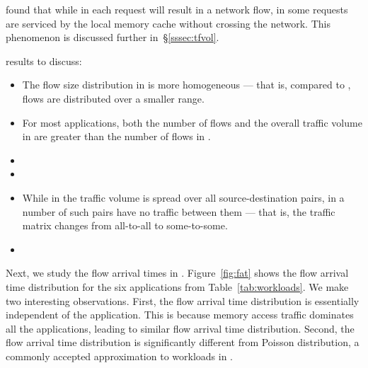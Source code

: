found that while in \pdis each request will result in a network flow, in \dis some requests are serviced by the local memory cache without crossing the network. This phenomenon is discussed further in~\S\ref{sssec:tfvol}.


 results to discuss:
\begin{itemize}
\item The flow size distribution in \dis is more homogeneous --- that is, compared to \pdis, flows are distributed over a smaller range. 
\item For most applications, both the number of flows and the overall traffic volume in \dis are greater than the number of flows in \pdis. 
\item {}
\item {} 
\item While in \pdis the traffic volume is spread over all source-destination pairs, in \dis a number of such pairs have no traffic between them --- that is, the traffic matrix changes from all-to-all to some-to-some.
\item {}
\end{itemize}
%

\label{sssec:fctv}


Next, we study the flow arrival times in \dis. Figure~\ref{fig:fat} shows the flow arrival time distribution for the six applications from Table~\ref{tab:workloads}. We make two interesting observations. First, the flow arrival time distribution is essentially independent of the application. This is because memory access traffic dominates all the applications, leading to similar flow arrival time distribution. Second, the flow arrival time distribution is significantly different from Poisson distribution, a commonly accepted approximation to workloads in \pdis. 

